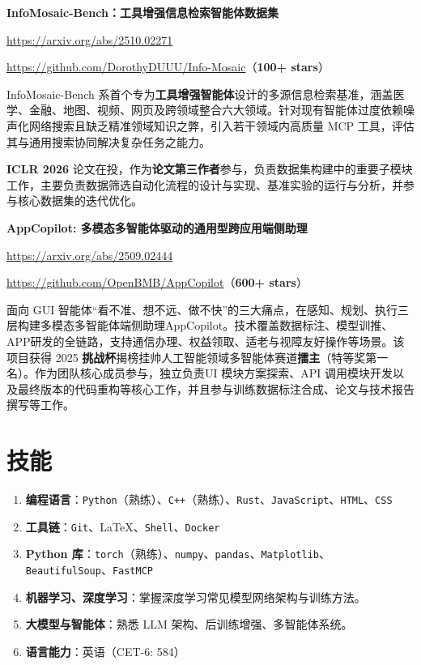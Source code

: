 \documentclass[letterpaper,11pt]{article}
\begin{document}
\textbf{InfoMosaic-Bench：工具增强信息检索智能体数据集}

\url{https://arxiv.org/abs/2510.02271}  

\url{https://github.com/DorothyDUUU/Info-Mosaic}（\textbf{100+ stars}）

InfoMosaic-Bench 系首个专为\textbf{工具增强智能体}设计的多源信息检索基准，涵盖医学、金融、地图、视频、网页及跨领域整合六大领域。针对现有智能体过度依赖噪声化网络搜索且缺乏精准领域知识之弊，引入若干领域内高质量 MCP 工具，评估其与通用搜索协同解决复杂任务之能力。

\textbf{ICLR 2026} 论文在投，作为\textbf{论文第三作者}参与，负责数据集构建中的重要子模块工作，主要负责数据筛选自动化流程的设计与实现、基准实验的运行与分析，并参与核心数据集的迭代优化。

\medskip

\textbf{AppCopilot: 多模态多智能体驱动的通用型跨应用端侧助理}

\url{https://arxiv.org/abs/2509.02444}  

\url{https://github.com/OpenBMB/AppCopilot}（\textbf{600+ stars}）

面向 GUI 智能体“看不准、想不远、做不快”的三大痛点，在感知、规划、执行三层构建多模态多智能体端侧助理AppCopilot。技术覆盖数据标注、模型训推、APP研发的全链路，支持通信办理、权益领取、适老与视障友好操作等场景。该项目获得 2025 \textbf{挑战杯}揭榜挂帅人工智能领域多智能体赛道\textbf{擂主}（特等奖第一名）。作为团队核心成员参与，独立负责UI 模块方案探索、API 调用模块开发以及最终版本的代码重构等核心工作，并且参与训练数据标注合成、论文与技术报告撰写等工作。









\section{技能}

\begin{enumerate}[itemsep=2pt, topsep=2pt, parsep=0pt, partopsep=0pt]
    \item \textbf{编程语言}：\texttt{Python}（熟练）、\texttt{C++}（熟练）、\texttt{Rust}、\texttt{JavaScript}、\texttt{HTML}、\texttt{CSS}  
    \item \textbf{工具链}：\texttt{Git}、\LaTeX、\texttt{Shell}、\texttt{Docker} 
    \item \textbf{Python 库}：\texttt{torch}（熟练）、\texttt{numpy}、\texttt{pandas}、\texttt{Matplotlib}、\texttt{BeautifulSoup}、\texttt{FastMCP}  
    \item \textbf{机器学习、深度学习}：掌握深度学习常见模型网络架构与训练方法。
    \item \textbf{大模型与智能体}：熟悉 LLM 架构、后训练增强、多智能体系统。
    \item \textbf{语言能力}：英语（CET-6: 584）
\end{enumerate}
\end{document}
